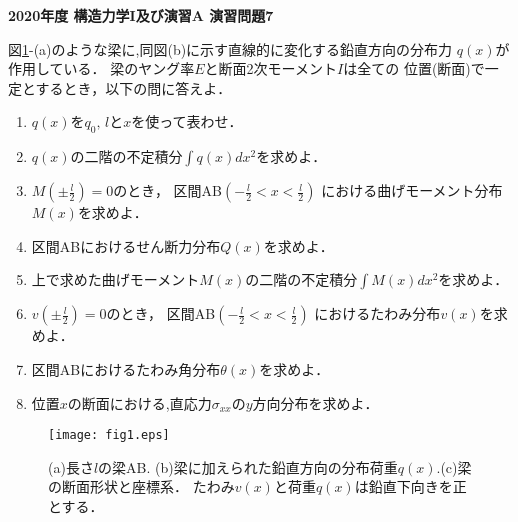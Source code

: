 \documentclass[10pt,a4j]{jarticle}
\newlength{\minitwocolumn}
\begin{document}
\newcommand{\fat}[1]{\mbox{\boldmath $#1$}}
\newcommand{\D}{\partial}
\newcommand{\w}{\omega}
\newcommand{\ga}{\alpha}
\newcommand{\gb}{\beta}
\newcommand{\gx}{\xi}
\newcommand{\gz}{\zeta}
\newcommand{\vhat}[1]{\hat{\fat{#1}}}
\newcommand{\spc}{\vspace{0.7\baselineskip}}
\newcommand{\halfspc}{\vspace{0.3\baselineskip}}

\pagestyle{empty}
\newcommand{\twofig}[2]
 {
   \begin{figure}[here]
     \begin{minipage}[t]{\minitwocolumn}
         \begin{center}   #1
         \end{center}
     \end{minipage}
         \hspace{\columnsep}
     \begin{minipage}[t]{\minitwocolumn}
         \begin{center} #2
         \end{center}
     \end{minipage}
   \end{figure}
 }
\begin{center}
	{\Large \bf 2020年度 構造力学I及び演習A 演習問題7}
\end{center}
\vspace{15mm}
図\ref{fig:fig1}-(a)のような梁に,同図(b)に示す直線的に変化する鉛直方向の分布力
$q(x)$が作用している． 梁のヤング率$E$と断面2次モーメント$I$は全ての
位置(断面)で一定とするとき，以下の問に答えよ．
\begin{enumerate}
\item
	$q(x)$を$q_0,\,l$と$x$を使って表わせ．
\item
	$q(x)$の二階の不定積分$\int q(x)dx^2$を求めよ．
\item
	$M\left(\pm\frac{l}{2}\right)=0$のとき，
	区間AB$\left( -\frac{l}{2}<x < \frac{l}{2}\right)$
	における曲げモーメント分布$M(x)$を求めよ．
\item
	区間ABにおけるせん断力分布$Q(x)$を求めよ．
\item
	上で求めた曲げモーメント$M(x)$の二階の不定積分$\int M(x) dx^2$を求めよ．
\item
	$v\left(\pm\frac{l}{2}\right)=0$のとき，
	区間AB$\left( -\frac{l}{2}<x < \frac{l}{2}\right)$
	におけるたわみ分布$v(x)$を求めよ．
\item
	区間ABにおけるたわみ角分布$\theta(x)$を求めよ．
\item
	位置$x$の断面における,直応力$\sigma_{xx}$の$y$方向分布を求めよ．     
\end{enumerate}
\begin{figure}[h]
	\begin{center}
	\texttt{[image: fig1.eps]} 
	\end{center}
	\caption{(a)長さ$l$の梁AB. (b)梁に加えられた鉛直方向の分布荷重$q(x)$.(c)梁の断面形状と座標系．
        たわみ$v(x)$と荷重$q(x)$は鉛直下向きを正とする．}
	\label{fig:fig1}
\end{figure}
\end{document}
